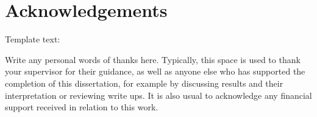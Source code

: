
\chapter*{Acknowledgements}

Template text:

Write any personal words of thanks here.
Typically, this space is used to thank your supervisor for their guidance,
as well as anyone else who has supported the completion of this dissertation,
for example by discussing results and their interpretation or reviewing
write ups.
It is also usual to acknowledge any financial support received in relation to
this work.

